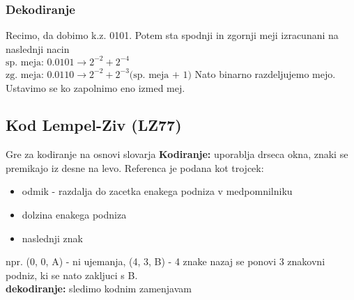 \documentclass{article}
\begin{document}
\begin{multicols}{4}
\subsubsection{Dekodiranje}
Recimo, da dobimo k.z. 0101. Potem sta spodnji in zgornji meji izracunani na
naslednji nacin\\
\begin{math}
    \text{sp. meja: } 0.0101 \rightarrow 2^{-2} + 2^{-4}
\end{math}\\
\begin{math}
    \text{zg. meja: } 0.0110 \rightarrow 2^{-2} + 2^{-3} \text{(sp. meja + 1)}
\end{math}
Nato binarno razdeljujemo mejo. Ustavimo se ko zapolnimo eno izmed mej.

\subsection{Kod Lempel-Ziv (LZ77)} 
Gre za kodiranje na osnovi slovarja
\textbf{Kodiranje:} uporablja drseca okna, znaki se premikajo iz desne na levo.
Referenca je podana kot trojcek:
\begin{itemize}
    \item odmik - razdalja do zacetka enakega podniza v medpomnilniku
    \item dolzina enakega podniza
    \item naslednji znak
\end{itemize}
npr. (0, 0, A) - ni ujemanja, (4, 3, B) - 4 znake nazaj se ponovi 3 znakovni podniz, ki se nato zakljuci s B.\\
\textbf{dekodiranje:} sledimo kodnim zamenjavam


\end{multicols}
\end{document}
